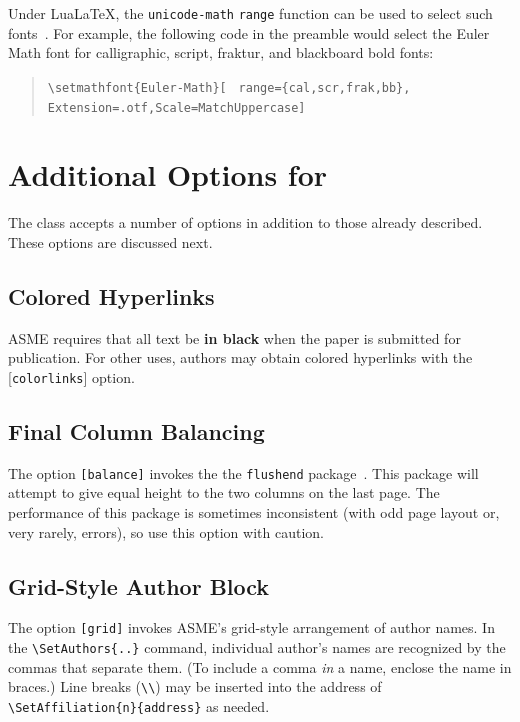 \documentclass[colorlinks,upint,subscriptcorrection,varvw,hyphenate,balance,greek,russian,vietnamese,german]{asmeconf} %
\newcommand*\LuaLaTeX{Lua\LaTeX}
\begin{document}
Under \LuaLaTeX, the \texttt{unicode-math} \texttt{range} function can be used to select such fonts~\cite{robertson2023}. For example, the following code in the preamble would select the Euler Math font for calligraphic, script, fraktur, and blackboard bold fonts:
\begin{quote}\raggedright
\verb|\setmathfont{Euler-Math}[|
\verb| range={cal,scr,frak,bb},|
\verb| Extension=.otf,Scale=MatchUppercase]|
\end{quote}



\section{Additional Options for }
The class accepts a number of options in addition to those already described. These options are discussed next.

\subsection{Colored Hyperlinks}
ASME requires that all text be \textbf{in black} when the paper is submitted for publication.  For other uses, authors may
obtain colored hyperlinks with the [\texttt{colorlinks}] option.

\subsection{Final Column Balancing} The option \texttt{[balance]} invokes the the \texttt{flushend} package~\cite{tolusis}.
This package will attempt to give equal height to the two columns on the last page. The performance of this package is sometimes inconsistent (with odd page layout or, very rarely, errors), so use this option with caution.

\subsection{Grid-Style Author Block} The option \texttt{[grid]} invokes ASME's grid-style arrangement of author names. In the \verb|\SetAuthors{..}| command, individual author's names are recognized by the commas that separate them. (To include a comma \emph{in} a name, enclose the name in braces.) Line breaks (\verb|\\|) may be inserted into the address of \verb|\SetAffiliation{n}{address}| as needed. 
\end{document}

